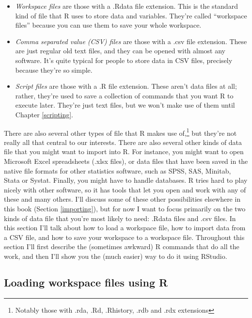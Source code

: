 \documentclass[
]{book}
\providecommand{\tightlist}{%
  \setlength{\itemsep}{0pt}\setlength{\parskip}{0pt}}
\begin{document}
\begin{itemize}
\tightlist
\item
  \emph{Workspace files} are those with a .Rdata file extension. This is the standard kind of file that R uses to store data and variables. They're called ``workspace files'' because you can use them to save your whole workspace.
\item
  \emph{Comma separated value (CSV) files} are those with a .csv file extension. These are just regular old text files, and they can be opened with almost any software. It's quite typical for people to store data in CSV files, precisely because they're so simple.
\item
  \emph{Script files} are those with a .R file extension. These aren't data files at all; rather, they're used to save a collection of commands that you want R to execute later. They're just text files, but we won't make use of them until Chapter \ref{scripting}.
\end{itemize}

There are also several other types of file that R makes use of,\footnote{Notably those with .rda, .Rd, .Rhistory, .rdb and .rdx extensions} but they're not really all that central to our interests. There are also several other kinds of data file that you might want to import into R. For instance, you might want to open Microsoft Excel spreadsheets (.xlsx files), or data files that have been saved in the native file formats for other statistics software, such as SPSS, SAS, Minitab, Stata or Systat. Finally, you might have to handle databases. R tries hard to play nicely with other software, so it has tools that let you open and work with any of these and many others. I'll discuss some of these other possibilities elsewhere in this book (Section \ref{importing}), but for now I want to focus primarily on the two kinds of data file that you're most likely to need: .Rdata files and .csv files.
In this section I'll talk about how to load a workspace file, how to import data from a CSV file, and how to save your workspace to a workspace file. Throughout this section I'll first describe the (sometimes awkward) R commands that do all the work, and then I'll show you the (much easier) way to do it using RStudio.

\hypertarget{loading-workspace-files-using-r}{%
\subsection{Loading workspace files using R}\label{loading-workspace-files-using-r}}
\end{document}
